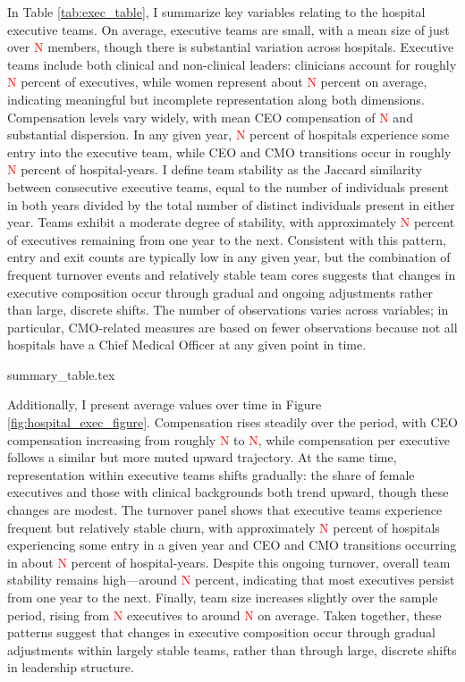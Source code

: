 \documentclass[12pt]{article}
\begin{document}
    In Table \ref{tab:exec_table}, I summarize key variables relating to the hospital executive teams. On average, executive teams are small, with a mean size of just over \textcolor{red}{N} members, though there is substantial variation across hospitals. Executive teams include both clinical and non-clinical leaders: clinicians account for roughly \textcolor{red}{N} percent of executives, while women represent about \textcolor{red}{N} percent on average, indicating meaningful but incomplete representation along both dimensions. Compensation levels vary widely, with mean CEO compensation of \textcolor{red}{N} and substantial dispersion. In any given year, \textcolor{red}{N} percent of hospitals experience some entry into the executive team, while CEO and CMO transitions occur in roughly \textcolor{red}{N} percent of hospital-years. I define team stability as the Jaccard similarity between consecutive executive teams, equal to the number of individuals present in both years divided by the total number of distinct individuals present in either year. Teams exhibit a moderate degree of stability, with approximately \textcolor{red}{N} percent of executives remaining from one year to the next. Consistent with this pattern, entry and exit counts are typically low in any given year, but the combination of frequent turnover events and relatively stable team cores suggests that changes in executive composition occur through gradual and ongoing adjustments rather than large, discrete shifts. The number of observations varies across variables; in particular, CMO-related measures are based on fewer observations because not all hospitals have a Chief Medical Officer at any given point in time. 


    {summary_table.tex}


    Additionally, I present average values over time in Figure \ref{fig:hospital_exec_figure}. Compensation rises steadily over the period, with CEO compensation increasing from roughly \textcolor{red}{N} to \textcolor{red}{N}, while compensation per executive follows a similar but more muted upward trajectory. At the same time, representation within executive teams shifts gradually: the share of female executives and those with clinical backgrounds both trend upward, though these changes are modest. The turnover panel shows that executive teams experience frequent but relatively stable churn, with approximately \textcolor{red}{N} percent of hospitals experiencing some entry in a given year and CEO and CMO transitions occurring in about \textcolor{red}{N} percent of hospital-years. Despite this ongoing turnover, overall team stability remains high—around \textcolor{red}{N} percent, indicating that most executives persist from one year to the next. Finally, team size increases slightly over the sample period, rising from \textcolor{red}{N} executives to around \textcolor{red}{N} on average. Taken together, these patterns suggest that changes in executive composition occur through gradual adjustments within largely stable teams, rather than through large, discrete shifts in leadership structure. 
\end{document}
